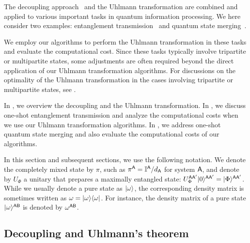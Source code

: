 




The decoupling approach~\cite{hayden2008decoupling, dupuis2010decoupling, Szehr2013decouple2design, dupuis2014one, preskill2016quantumshannon} and the Uhlmann transformation are combined and applied to various important tasks in quantum information processing.
We here consider two examples: entanglement transmission~\cite{Schumacher1996sendingentanglement, schumacher2001approximateerrorcorrection, hayden2007black, datta2013oneshotentassistQCcom, beigi2016decoding, khatri2024principlemodern} and quantum state merging~\cite{Horodecki2005Partialquantinfo, berta2008singleshot, dupuis2014one, yamasaki2019statemergesmalldimension}.

We employ our algorithms to perform the Uhlmann transformation in these tasks and evaluate the computational cost.
Since these tasks typically involve tripartite or multipartite states, some adjustments are often required beyond the direct application of our Uhlmann transformation algorithms.
For discussions on the optimality of the Uhlmann transformation in the cases involving tripartite or multipartite states, see .

In , we overview the decoupling and the Uhlmann transformation. In , we discuss one-shot entanglement transmission and analyze the computational costs when we use our Uhlmann transformation algorithms. 
In , we address one-shot quantum state merging and also evaluate the computational costs of our algorithms.


In this section and subsequent sections, we use the following notation.
We denote the completely mixed state by $\pi$, such as $\pi^{\mathsf{A}} = \mathbb{I}^{\mathsf{A}}/d_{\mathsf{A}}$ for system ${\mathsf{A}}$, and denote by $U_\Phi$ a unitary that prepares a maximally entangled state: $U_\Phi^{{\mathsf{A}}{\mathsf{A}}'}|0\rangle^{{\mathsf{A}}{\mathsf{A}}'} = |\Phi\rangle^{{\mathsf{A}}{\mathsf{A}}'}$.
While we usually denote a pure state as $|\omega\rangle$, the corresponding density matrix is sometimes written as $\omega = |\omega\rangle\langle\omega|$. For instance, the density matrix of a pure state $|\omega\rangle^{{\mathsf{A}}{\mathsf{B}}}$ is denoted by $\omega^{{\mathsf{A}}{\mathsf{B}}}$.





\subsection{Decoupling and Uhlmann's theorem}
\label{sec:general decoup and Uhl}


